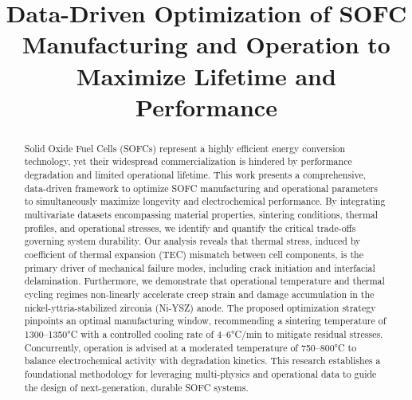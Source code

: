 \documentclass[conference]{IEEEtran}
\begin{document}
\title{Data-Driven Optimization of SOFC Manufacturing and Operation to Maximize Lifetime and Performance}

\author{
\and
{}
\and
{}
}

\maketitle

\begin{abstract}
Solid Oxide Fuel Cells (SOFCs) represent a highly efficient energy conversion technology, yet their widespread commercialization is hindered by performance degradation and limited operational lifetime. This work presents a comprehensive, data-driven framework to optimize SOFC manufacturing and operational parameters to simultaneously maximize longevity and electrochemical performance. By integrating multivariate datasets encompassing material properties, sintering conditions, thermal profiles, and operational stresses, we identify and quantify the critical trade-offs governing system durability. Our analysis reveals that thermal stress, induced by coefficient of thermal expansion (TEC) mismatch between cell components, is the primary driver of mechanical failure modes, including crack initiation and interfacial delamination. Furthermore, we demonstrate that operational temperature and thermal cycling regimes non-linearly accelerate creep strain and damage accumulation in the nickel-yttria-stabilized zirconia (Ni-YSZ) anode. The proposed optimization strategy pinpoints an optimal manufacturing window, recommending a sintering temperature of 1300–1350°C with a controlled cooling rate of 4–6°C/min to mitigate residual stresses. Concurrently, operation is advised at a moderated temperature of 750–800°C to balance electrochemical activity with degradation kinetics. This research establishes a foundational methodology for leveraging multi-physics and operational data to guide the design of next-generation, durable SOFC systems.
\end{abstract}
\end{document}
